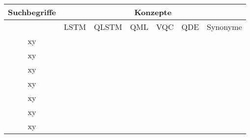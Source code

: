 \label{search}

\begin{tabular}{|c|c|c|c|c|c|c|}
    \hline
    \textbf{Suchbegriffe} & \multicolumn{6}{|c|}{\textbf{Konzepte}} \\
    \hline
     & \ac{LSTM} & \ac{QLSTM} & \ac{QML} & \ac{VQC} & QDE & Synonyme \\
    \hline
    xy & & & & & & \\
    xy & & & & & & \\
    xy & & & & & & \\
    xy & & & & & & \\
    xy & & & & & & \\
    xy & & & & & & \\
    xy & & & & & & \\
    \hline
\end{tabular}

\newpage
